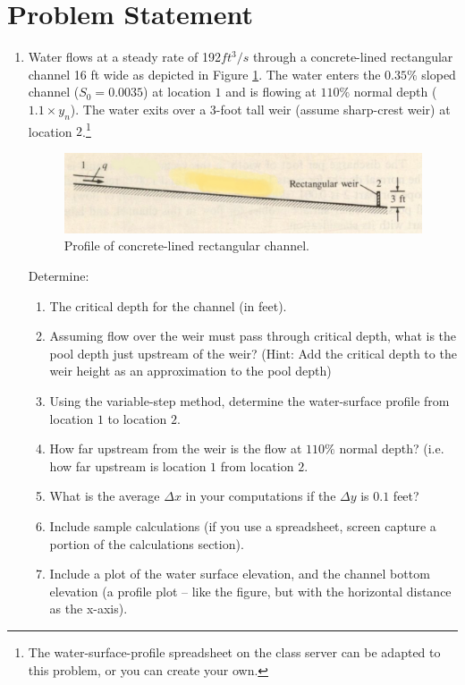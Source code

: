\documentclass[12pt]{article}
\begin{document}
\section*{\small{Problem Statement}}
\begin{enumerate}
\item Water flows at a steady rate of 192$ft^3/s$ through a concrete-lined rectangular channel 16 ft wide as depicted in Figure \ref{fig:channel_profile}. The water enters the $0.35 \%$ sloped channel ($S_0 = 0.0035$) at location $1$ and is flowing at $110\%$ normal depth ($1.1 \times y_n$).  The water exits over a 3-foot tall weir (assume sharp-crest weir) at location $2$.\footnote{The water-surface-profile spreadsheet on the class server can be adapted to this problem, or you can create your own.}

\begin{figure}[htbp] %
   \centering
   \includegraphics[width=6in]{channel_profile.jpg} 
   \caption{Profile of concrete-lined rectangular channel.}
   \label{fig:channel_profile}
\end{figure}

Determine: 
\begin{enumerate}[i]
\item The critical depth for the channel (in feet).
\item Assuming flow over the weir must pass through critical depth, what is the pool depth just upstream of the weir? (Hint: Add the critical depth to the weir height as an approximation to the pool depth)
\item Using the variable-step method, determine the water-surface profile from location $1$ to location $2$.
\item How far upstream from the weir is the flow at $110\%$ normal depth? (i.e. how far upstream is location $1$ from location $2$.
\item What is the average $\Delta x$ in your computations if the $\Delta y$ is $0.1$ feet?
\item Include sample calculations (if you use a spreadsheet, screen capture a portion of the calculations section).
\item Include a plot of the water surface elevation, and the channel bottom elevation (a profile plot -- like the figure, but with the horizontal distance as the x-axis).
\end{enumerate}


\end{enumerate}
\end{document}
